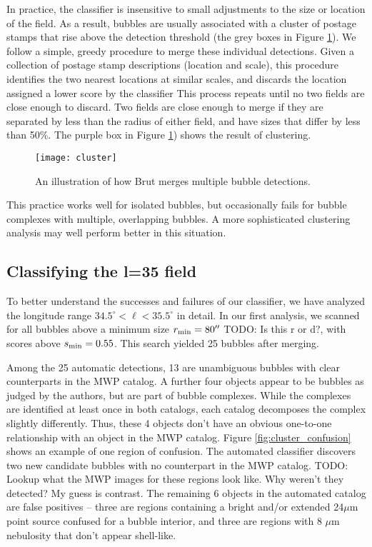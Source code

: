 \documentclass[preprint]{aastex}
\newcommand{\todo}[1]{{\color[rgb]{0, .5, .5} TODO: #1}}
\newcommand{\um}[0]{$\mu$m}
\begin{document}
In practice, the classifier is insensitive to small adjustments to the size or location of the field. As a result, bubbles are usually associated with a cluster of postage stamps that rise above the detection threshold (the grey boxes in Figure \ref{fig:cluster}). We follow a simple, greedy procedure to merge these individual detections. Given a collection of postage stamp descriptions (location and scale), this procedure identifies the two nearest locations at similar scales, and discards the location assigned a lower score by the classifier This process repeats until no two fields are close enough to discard. Two fields are close enough to merge if they are separated by less than the radius of either field, and have sizes that differ by less than 50\%. The purple box in Figure \ref{fig:cluster}) shows the result of clustering.

\begin{figure}
\texttt{[image: cluster]}
\caption{An illustration of how Brut merges multiple bubble detections.}
\label{fig:cluster}
\end{figure}
 


 
This practice works well for isolated bubbles, but occasionally fails for bubble complexes with multiple, overlapping bubbles. A more sophisticated clustering analysis may well perform better in this situation.

\subsection{Classifying the l=35 field}
\label{sec:case_study}
To better understand the successes and failures of our classifier, we have analyzed the longitude range $34.5^\circ < \ell < 35.5^\circ$ in detail. In our first analysis, we scanned for all bubbles above a minimum size $r _{\rm min} = 80''$ \todo{Is this r or d?}, with scores above $s_{\rm min} = 0.55$. This search yielded 25 bubbles after merging. 

Among the 25 automatic detections, 13 are unambiguous bubbles with clear counterparts in the MWP catalog. A further four objects appear to be bubbles as judged by the authors, but are part of bubble complexes. While the complexes are identified at least once in both catalogs, each catalog decomposes the complex slightly differently. Thus, these 4 objects don't have an obvious one-to-one relationship with an object in the MWP catalog. Figure \ref{fig:cluster_confusion} shows an example of one region of confusion. The automated classifier discovers two new candidate bubbles with no counterpart in the MWP catalog. \todo{Lookup what the MWP images for these regions look like. Why weren't they detected? My guess is contrast}. The remaining 6 objects in the automated catalog are false positives -- three are regions containing a bright and/or extended 24\um\, point source confused for a bubble interior, and three are regions with 8 \um\, nebulosity that don't appear shell-like.
\end{document}
